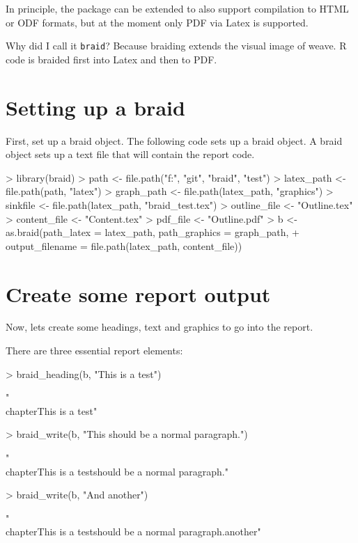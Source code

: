 \documentclass[a4paper]{article}
\newcommand{\braid}{{\tt braid}}
\begin{document}
In principle, the package can be extended to also support compilation to HTML or ODF formats, but at the moment only PDF via Latex is supported.

Why did I call it \braid{}?  Because braiding extends the visual image of weave. R code is braided first into Latex and then to PDF. 


\section{Setting up a braid}

First, set up a braid object.  The following code sets up a braid object.  A braid object sets up a text file that will contain the report code.

\begin{Schunk}
\begin{Sinput}
> library(braid)
> path <- file.path("f:", "git", "braid", "test")
> latex_path <- file.path(path, "latex")
> graph_path <- file.path(latex_path, "graphics")
> sinkfile <- file.path(latex_path, "braid_test.tex")
> outline_file <- "Outline.tex"
> content_file <- "Content.tex"
> pdf_file <- "Outline.pdf"
> b <- as.braid(path_latex = latex_path, path_graphics = graph_path, 
+     output_filename = file.path(latex_path, content_file))
\end{Sinput}
\end{Schunk}

\section{Create some report output}

Now, lets create some headings, text and graphics to go into the report.

There are three essential report elements:


\begin{Schunk}
\begin{Sinput}
> braid_heading(b, "This is a test")
\end{Sinput}
\begin{Soutput}
[1] "\\chapter{This is a test}\n\n"
\end{Soutput}
\begin{Sinput}
> braid_write(b, "This should be a normal paragraph.")
\end{Sinput}
\begin{Soutput}
[1] "\\chapter{This is a test}\n\nThis should be a normal paragraph.\n"
\end{Soutput}
\begin{Sinput}
> braid_write(b, "And another")
\end{Sinput}
\begin{Soutput}
[1] "\\chapter{This is a test}\n\nThis should be a normal paragraph.\nAnd another\n"
\end{Soutput}
\end{Schunk}
\end{document}
